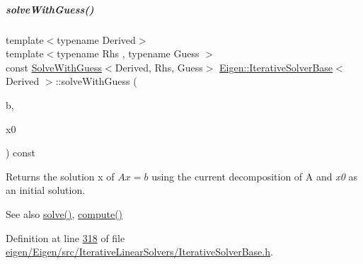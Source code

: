 \mbox{\label{group___iterative_linear_solvers___module_adcc18d1ab283786dcbb5a3f63f4b4bd8}} 
\subparagraph{\texorpdfstring{solve\+With\+Guess()}{solveWithGuess()}\hspace{0.1cm}{\footnotesize\ttfamily [2/2]}}
{\footnotesize\ttfamily template$<$typename Derived$>$ \\
template$<$typename Rhs , typename Guess $>$ \\
const \hyperlink{group___iterative_linear_solvers___module_class_eigen_1_1_solve_with_guess}{Solve\+With\+Guess}$<$Derived, Rhs, Guess$>$ \hyperlink{group___iterative_linear_solvers___module_class_eigen_1_1_iterative_solver_base}{Eigen\+::\+Iterative\+Solver\+Base}$<$ Derived $>$\+::solve\+With\+Guess (\begin{DoxyParamCaption}\item[{const \hyperlink{group___core___module_class_eigen_1_1_matrix_base}{Matrix\+Base}$<$ Rhs $>$ \&}]{b,  }\item[{const Guess \&}]{x0 }\end{DoxyParamCaption}) const\hspace{0.3cm}{\ttfamily [inline]}}

\begin{DoxyReturn}{Returns}
the solution x of $ A x = b $ using the current decomposition of A and {\itshape x0} as an initial solution.
\end{DoxyReturn}
\begin{DoxySeeAlso}{See also}
\hyperlink{group___sparse_core___module_a4a66e9498b06e3ec4ec36f06b26d4e8f}{solve()}, \hyperlink{group___iterative_linear_solvers___module_a7dfa55c55e82d697bde227696a630914}{compute()} 
\end{DoxySeeAlso}


Definition at line \hyperlink{eigen_2_eigen_2src_2_iterative_linear_solvers_2_iterative_solver_base_8h_source_l00318}{318} of file \hyperlink{eigen_2_eigen_2src_2_iterative_linear_solvers_2_iterative_solver_base_8h_source}{eigen/\+Eigen/src/\+Iterative\+Linear\+Solvers/\+Iterative\+Solver\+Base.\+h}.

